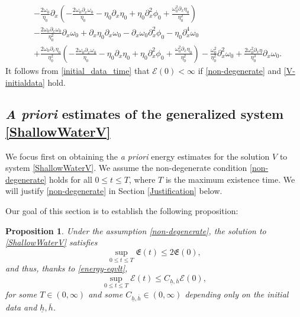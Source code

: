 \documentclass[reqno,11pt]{amsart}
\theoremstyle{plain}
\newtheorem{proposition}[theorem]{Proposition}
\theoremstyle{definition}
\numberwithin{equation}{section}
\begin{document}
\begin{equation}
\begin{aligned}
     &-\frac{2\omega_0}{\eta_0}\partial_x \left(- \frac{2\omega_0\partial_x \omega_0}{\eta_0}  - \eta_0 \partial_x \eta_0 + \eta_0 \partial_{x}^2 \phi_0 + \frac{\omega_0^2 \partial_x \eta_0}{\eta_0^2}\right)\\
     &-\frac{2\omega_0\partial_x \omega_0}{\eta_0^2}\partial_x\omega_0+\partial_x\eta_0\partial_x \omega_0 -\partial_x\omega_0\partial_x^2\phi_0-\eta_0\partial_x^4 \omega_0  \\
     & +\frac{2\omega_0\partial_x\eta_0}{\eta_0^2} \left(- \frac{2\omega_0\partial_x \omega_0}{\eta_0}  - \eta_0 \partial_x \eta_0 + \eta_0 \partial_{x}^2 \phi_0 + \frac{\omega_0^2 \partial_x \eta_0}{\eta_0^2}\right)-\frac{\omega_0^2}{\eta_0^2} \partial_x^2 \omega_0+\frac{2\omega_0^2\partial_x\eta}{\eta_0^3} \partial_x \omega_0.
\end{aligned}
\end{equation}
It follows from \eqref{initial_data_time} that 
$ \mathcal E(0) < \infty $ if \eqref{non-degenerate} and \eqref{V-initialdata} hold.%

\subsection{\textit{A priori} estimates of the generalized system \eqref{ShallowWaterV}} 
We focus first on obtaining the {\it a priori} energy estimates for the solution $ V $ to system \eqref{ShallowWaterV}. We assume the non-degenerate condition \eqref{non-degenerate} holds
for all $0\leq t \leq T$, where $T$ is the maximum existence time. We will justify \eqref{non-degenerate} in Section \ref{Justification} below.

Our goal of this section is to establish the following proposition:
\begin{proposition}
    \label{prop:a-priori-V}
    Under the assumption \eqref{non-degenerate}, the solution to \eqref{ShallowWaterV} satisfies
    \begin{equation}
        \label{est:a-priori-energy-0}
        \sup_{0\leq t \leq T} \mathfrak E(t) \leq 2 \mathfrak  E(0),
    \end{equation}
    and thus, thanks to \eqref{energy-eqvlt}, 
    \begin{equation}
        \label{est:a-priori-energy}
        \sup_{0\leq t \leq T} \mathcal E(t) \leq C_{\underline h, \overline h} \mathcal  E(0),
    \end{equation}
    for some $ T \in (0,\infty) $ and some $ C_{\underline h, \overline h} \in (0,\infty) $ depending only on the initial data and $ \underline h, \overline h $. 
\end{proposition}
\end{document}
